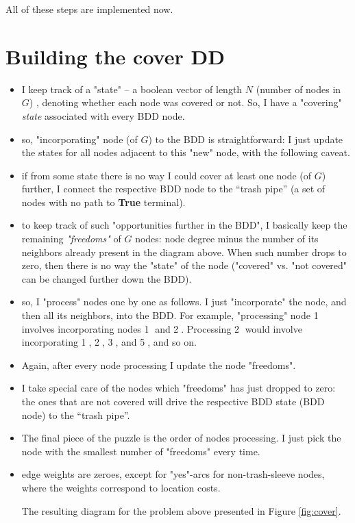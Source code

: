 \documentclass[11pt]{article}
\begin{document}
All of these steps are implemented now.

\section{Building the cover DD}
\label{sec:orga17d662}
\begin{itemize}
\item I keep track of a "state" -- a boolean vector of length \(N\) (number of nodes
in \(G\)) , denoting whether each node was covered or not. So, I have a
"covering" \emph{state} associated with every BDD node.
\item so, "incorporating" node (of \(G\)) to the BDD is straightforward: I just update
the states for all nodes adjacent to this "new" node, with the following caveat.
\item if from some state there is no way I could cover at least one node (of \(G\))
further, I connect the respective BDD node to the ``trash pipe'' (a set of
nodes with no path to \textbf{True} terminal).
\item to keep track of such "opportunities further in the BDD", I basically keep the
remaining \emph{"freedoms"} of \(G\) nodes: node degree minus the number of its
neighbors already present in the diagram above. When such number drops to
zero, then there is no way the "state" of the node ("covered" vs. "not
covered" can be changed further down the BDD).
\item so, I "process" nodes one by one as follows. I just "incorporate" the node,
and then all its neighbors, into the BDD. For example, "processing" node
\textcircled{1} involves incorporating nodes \textcircled{1} and
\textcircled{2}. Processing \textcircled{2} would involve incorporating
\textcircled{1}, \textcircled{2}, \textcircled{3}, and \textcircled{5}, and so
on.
\item Again, after every node processing I update the node "freedoms".
\item I take special care of the nodes which "freedoms" has just dropped to zero: the ones
that are not covered will drive the respective BDD state (BDD node) to the
``trash pipe''.
\item The final piece of the puzzle is the order of nodes processing. I just pick
the node with the smallest number of "freedoms" every time.
\item edge weights are zeroes, except for "yes"-arcs for non-trash-sleeve nodes,
where the weights correspond to location costs.

The resulting diagram for the problem above presented in Figure \ref{fig:cover}.
\end{itemize}
\end{document}
